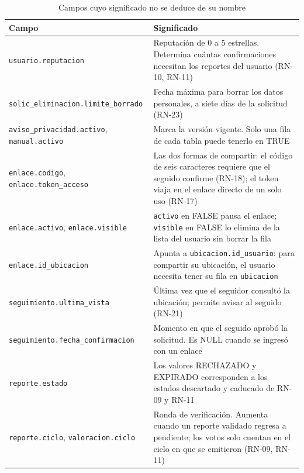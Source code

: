 \begin{table}[H]
\centering
\footnotesize
\caption{Campos cuyo significado no se deduce de su nombre}
\label{tab:dd_campos}
\renewcommand{\arraystretch}{1.3}
\begin{tabular}{|D{0.36\textwidth}|D{0.56\textwidth}|}
\hline
\textbf{Campo} & \textbf{Significado} \\ \hline
\texttt{usuario.\allowbreak reputacion} & Reputación de 0 a 5 estrellas. Determina cuántas confirmaciones necesitan los reportes del usuario (RN-10, RN-11) \\ \hline
\texttt{solic\_eliminacion.\allowbreak limite\_borrado} & Fecha máxima para borrar los datos personales, a siete días de la solicitud (RN-23) \\ \hline
\texttt{aviso\_privacidad.\allowbreak activo}, \texttt{manual.\allowbreak activo} & Marca la versión vigente. Solo una fila de cada tabla puede tenerlo en TRUE \\ \hline
\texttt{enlace.\allowbreak codigo}, \texttt{enlace.\allowbreak token\_acceso} & Las dos formas de compartir: el código de seis caracteres requiere que el seguido confirme (RN-18); el token viaja en el enlace directo de un solo uso (RN-17) \\ \hline
\texttt{enlace.\allowbreak activo}, \texttt{enlace.\allowbreak visible} & \texttt{activo} en FALSE pausa el enlace; \texttt{visible} en FALSE lo elimina de la lista del usuario sin borrar la fila \\ \hline
\texttt{enlace.\allowbreak id\_ubicacion} & Apunta a \texttt{ubicacion.\allowbreak id\_usuario}: para compartir su ubicación, el usuario necesita tener su fila en \texttt{ubicacion} \\ \hline
\texttt{seguimiento.\allowbreak ultima\_vista} & Última vez que el seguidor consultó la ubicación; permite avisar al seguido (RN-21) \\ \hline
\texttt{seguimiento.\allowbreak fecha\_confirmacion} & Momento en que el seguido aprobó la solicitud. Es NULL cuando se ingresó con un enlace \\ \hline
\texttt{reporte.\allowbreak estado} & Los valores RECHAZADO y EXPIRADO corresponden a los estados descartado y caducado de RN-09 y RN-11 \\ \hline
\texttt{reporte.\allowbreak ciclo}, \texttt{valoracion.\allowbreak ciclo} & Ronda de verificación. Aumenta cuando un reporte validado regresa a pendiente; los votos solo cuentan en el ciclo en que se emitieron (RN-09, RN-11) \\ \hline

\end{tabular}
\end{table}
